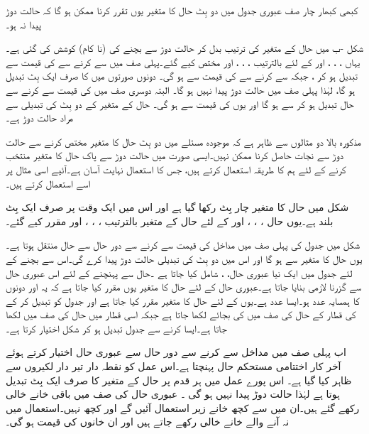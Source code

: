 کبھی کبھار چار صف عبوری جدول میں دو بِٹ حال کا متغیر یوں تقرر کرنا ممکن ہو گا کہ حالت دوڑ پیدا نہ ہو۔

شکل  -ب میں حال کے متغیر کی ترتیب بدل کر حالت دوڑ سے بچنے کی (نا کام) کوشش کی گئی ہے۔ یہاں ، ، ، اور  کے لئے بالترتیب ، ، ، اور  مختص کیے گئے۔پہلی صف میں سے  کرنے سے  کی قیمت  سے تبدیل ہو کر  ، جبکہ  سے  کرنے سے  کی قیمت  سے  ہو گی۔ دونوں صورتوں میں  کا صرف ایک بِٹ تبدیل ہو گا، لہٰذا پہلی صف میں حالت دوڑ پیدا نہیں ہو گا۔ البتہ دوسری صف میں  کی قیمت  سے  کرنے سے حال تبدیل ہو کر  سے  ہو گا اور یوں  کی قیمت  سے  ہو گی۔ حال کے متغیر کے دو بِٹ کی تبدیلی سے مراد حالت دوڑ ہے۔

مذکورہ بالا دو مثالوں سے ظاہر ہے کہ موجودہ مسئلے میں دو بِٹ حال کا متغیر مختص کرنے سے حالت دوڑ سے نجات حاصل کرنا ممکن نہیں۔ایسی صورت میں حالت دوڑ سے پاک حال کا متغیر منتخب کرنے کے لئے ہم  کا طریقہ استعمال کرتے ہیں، جس کا استعمال نہایت آسان ہے۔آئیے اسی مثال پر اسے استعمال کرتے ہیں۔

شکل میں حال کا متغیر چار بِٹ رکھا گیا ہے اور اس میں ایک وقت پر صرف ایک بِٹ بلند ہے۔یوں حال  ، ، ، اور  کے لئے حال کے متغیر بالترتیب ، ، ، اور  مقرر کیے گئے۔


شکل  میں جدول کی پہلی صف میں مداخل کی قیمت  سے  کرنے سے دور حال  سے حال  منتقل ہوتا ہے۔یوں حال کا متغیر  سے  ہو گا اور اس میں دو بِٹ کی تبدیلی حالت دوڑ پیدا کرے گی۔اس سے بچنے کے لئے جدول میں ایک نیا عبوری حال، ، شامل کیا جاتا ہے ۔حال  سے  پہنچنے کے لئے اس عبوری حال سے گزرنا لازمی بنایا جاتا ہے۔عبوری حال  کے لئے حال کا متغیر یوں مقرر کیا جاتا ہے کہ یہ  اور دونوں کا ہمسایہ عدد ہو۔ایسا عدد  ہے۔یوں  کے لئے حال کا متغیر  مقرر کیا جاتا ہے اور جدول کو تبدیل کر کے کی قطار کے حال  کی صف میں  کی بجائے  لکھا جاتا ہے جبکہ اسی قطار میں حال  کی صف میں  لکھا جاتا ہے۔ایسا کرنے سے جدول تبدیل ہو کر شکل  اختیار کرتا ہے۔


اب پہلی صف میں مداخل  سے  کرنے سے دور حال  سے عبوری حال  اختیار کرتے ہوئے آخر کار اختتامی مستحکم حال  پہنچتا ہے۔اس عمل کو نقطہ دار تیر دار لکیروں سے ظاہر کیا گیا ہے۔ اس پورے عمل میں ہر قدم پر حال کے متغیر کا صرف ایک بِٹ تبدیل ہوتا ہے لہٰذا حالت دوڑ پیدا نہیں ہو گی ۔ عبوری حال  کی صف میں باقی خانے خالی رکھے گئے ہیں۔ان میں سے کچھ خانے زیر استعمال آئیں گے اور کچھ نہیں۔استعمال میں نہ آنے والے خانے خالی رکھے جاتے ہیں اور ان خانوں کی قیمت ہو گی۔

